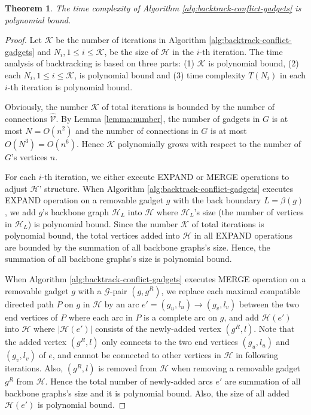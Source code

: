 \documentclass[11pt]{article}
\newcommand{\KK}{\mathcal{K}}
\newcommand{\HH}{\mathcal{H}}
\newcommand{\GG}{\mathcal{G}}
\newcommand{\VV}{\mathcal{V}}
\newtheorem{theorem}[figure]{Theorem}
\begin{document}
\begin{theorem}\label{thm:backtracking-time}
The time complexity of Algorithm \ref{alg:backtrack-conflict-gadgets} is polynomial bound.
\end{theorem}

\begin{proof}



Let $\KK$ be the number of iterations in Algorithm \ref{alg:backtrack-conflict-gadgets}
and $N_i, 1\leq i\leq \KK$, be the size of $\HH$ in the $i$-th iteration.
The time analysis of backtracking is based on three parts:
(1) $\KK$ is polynomial bound,
(2) each $N_i, 1\leq i\leq \KK$, is polynomial bound and
(3) time complexity $T(N_i)$ in each $i$-th iteration is polynomial bound.


Obviously, the number $\KK$ of total iterations is bounded by the number of connections $\hat{\VV}$.
By Lemma \ref{lemma:number}, the number of gadgets in $G$ is at most $N=O(n^2)$ and the number
of connections in $G$ is at most $O(N^3)=O(n^6)$.
Hence $\KK$ polynomially grows with respect to the number of $G$'s vertices $n$.

For each $i$-th iteration, we either execute EXPAND or MERGE operations to adjust $\HH$' structure.
When Algorithm \ref{alg:backtrack-conflict-gadgets} executes EXPAND operation on a removable gadget $g$ with the back boundary $L=\beta(g)$,
we add $g$'s backbone graph $\HH_L$ into $\HH$ where $\HH_L$'s size (the number of vertices
in $\HH_L$) is polynomial bound.
Since the number $\KK$ of total iterations is polynomial bound,
the total vertices added into $\HH$ in all EXPAND operations are bounded
by the summation of all backbone graphs's size.
Hence, the summation of all backbone graphs's size is polynomial bound.

When Algorithm \ref{alg:backtrack-conflict-gadgets} executes MERGE operation
on a removable gadget $g$ with a $\GG$-pair $(g, g^R)$,
we replace each maximal compatible directed path $P$ on $g$ in $\HH$ by
an arc $e'=(g_u, l_u)\rightarrow (g_v, l_v)$ between the two end vertices of $P$ where
each arc in $P$ is a complete arc on $g$, and
add $\HH(e')$ into $\HH$ where $|\HH(e')|$ consists of the newly-added vertex $(g^R, l)$.
Note that the added vertex $(g^R, l)$ only connects to the two end vertices $(g_u, l_u)$ and $(g_v, l_v)$ of $e$,
and cannot be connected to other vertices in $\HH$ in following iterations.
Also, $(g^R, l)$ is removed from $\HH$ when removing a removable gadget $g^R$ from $\HH$.
Hence the total number of newly-added arcs $e'$ are summation of all backbone graphs's size and
it is polynomial bound.
Also, the size of all added $\HH(e')$ is polynomial bound.


\end{proof}
\end{document}
